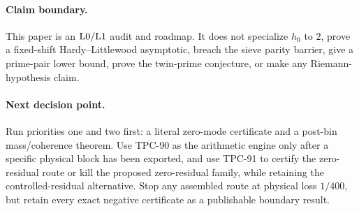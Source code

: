 \paragraph{Claim boundary.}
This paper is an \(\mathrm{L0}/\mathrm{L1}\) audit and roadmap.  It does not
specialize \(h_0\) to \(2\), prove a fixed-shift Hardy--Littlewood
asymptotic, breach the sieve parity barrier, give a prime-pair lower
bound, prove the twin-prime conjecture, or make any Riemann-hypothesis
claim.

\paragraph{Next decision point.}
Run priorities one and two first: a literal zero-mode certificate and
a post-bin mass/coherence theorem.  Use TPC-90 as the arithmetic
engine only after a specific physical block has been exported, and
use TPC-91 to certify the zero-residual route or kill the proposed
zero-residual family, while retaining the controlled-residual
alternative.  Stop
any assembled route at physical loss \(1/400\), but retain every exact
negative certificate as a publishable boundary result.
